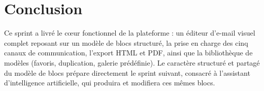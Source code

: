 
\section*{Conclusion}
Ce sprint a livré le c\oe{}ur fonctionnel de la plateforme : un éditeur
d'e-mail visuel complet reposant sur un modèle de blocs structuré, la prise
en charge des cinq canaux de communication, l'export HTML et PDF, ainsi que
la bibliothèque de modèles (favoris, duplication, galerie prédéfinie). Le
caractère structuré et partagé du modèle de blocs prépare directement le
sprint suivant, consacré à l'assistant d'intelligence artificielle, qui
produira et modifiera ces mêmes blocs.
